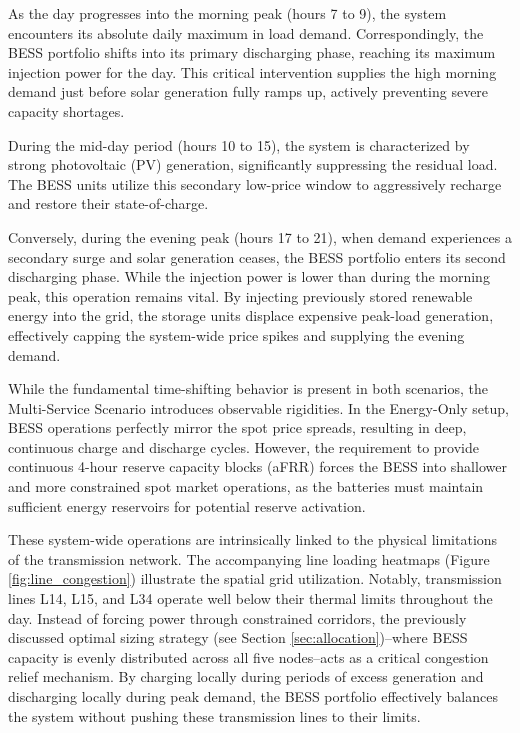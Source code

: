 As the day progresses into the morning peak (hours 7 to 9), the system encounters its absolute daily maximum in load demand. Correspondingly, the BESS portfolio shifts into its primary discharging phase, reaching its maximum injection power for the day. This critical intervention supplies the high morning demand just before solar generation fully ramps up, actively preventing severe capacity shortages.

During the mid-day period (hours 10 to 15), the system is characterized by strong photovoltaic (PV) generation, significantly suppressing the residual load. The BESS units utilize this secondary low-price window to aggressively recharge and restore their state-of-charge. 

Conversely, during the evening peak (hours 17 to 21), when demand experiences a secondary surge and solar generation ceases, the BESS portfolio enters its second discharging phase. While the injection power is lower than during the morning peak, this operation remains vital. By injecting previously stored renewable energy into the grid, the storage units displace expensive peak-load generation, effectively capping the system-wide price spikes and supplying the evening demand.

While the fundamental time-shifting behavior is present in both scenarios, the Multi-Service Scenario introduces observable rigidities. In the Energy-Only setup, BESS operations perfectly mirror the spot price spreads, resulting in deep, continuous charge and discharge cycles. However, the requirement to provide continuous 4-hour reserve capacity blocks (aFRR) forces the BESS into shallower and more constrained spot market operations, as the batteries must maintain sufficient energy reservoirs for potential reserve activation.

These system-wide operations are intrinsically linked to the physical limitations of the transmission network. The accompanying line loading heatmaps (Figure \ref{fig:line_congestion}) illustrate the spatial grid utilization. Notably, transmission lines L14, L15, and L34 operate well below their thermal limits throughout the day. Instead of forcing power through constrained corridors, the previously discussed optimal sizing strategy (see Section \ref{sec:allocation})--where BESS capacity is evenly distributed across all five nodes--acts as a critical congestion relief mechanism. By charging locally during periods of excess generation and discharging locally during peak demand, the BESS portfolio effectively balances the system without pushing these transmission lines to their limits.

